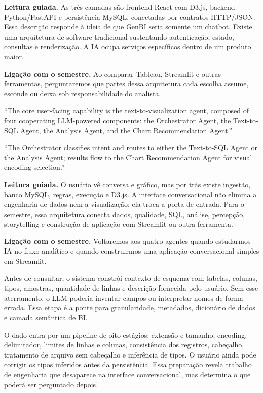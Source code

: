 \noindent\textbf{Leitura guiada.} As três camadas são frontend React com D3.js, backend Python/FastAPI e persistência MySQL, conectadas por contratos HTTP/JSON. Essa descrição responde à ideia de que GenBI seria somente um chatbot. Existe uma arquitetura de software tradicional sustentando autenticação, estado, consultas e renderização. A IA ocupa serviços específicos dentro de um produto maior.

\noindent\textbf{Ligação com o semestre.} Ao comparar Tableau, Streamlit e outras ferramentas, perguntaremos que partes dessa arquitetura cada escolha assume, esconde ou deixa sob responsabilidade do analista.

\begin{ArticleBox}
``The core user-facing capability is the text-to-visualization agent, composed of four cooperating LLM-powered components: the Orchestrator Agent, the Text-to-SQL Agent, the Analysis Agent, and the Chart Recommendation Agent.''

``The Orchestrator classifies intent and routes to either the Text-to-SQL Agent or the Analysis Agent; results flow to the Chart Recommendation Agent for visual encoding selection.''
\end{ArticleBox}

\noindent\textbf{Leitura guiada.} O usuário vê conversa e gráfico, mas por trás existe ingestão, banco MySQL, regras, execução e D3.js. A interface conversacional não elimina a engenharia de dados nem a visualização; ela troca a porta de entrada. Para o semestre, essa arquitetura conecta dados, qualidade, SQL, análise, percepção, storytelling e construção de aplicação com Streamlit ou outra ferramenta.

\noindent\textbf{Ligação com o semestre.} Voltaremos aos quatro agentes quando estudarmos IA no fluxo analítico e quando construirmos uma aplicação conversacional simples em Streamlit.

Antes de consultar, o sistema constrói contexto de esquema com tabelas, colunas, tipos, amostras, quantidade de linhas e descrição fornecida pelo usuário. Sem esse aterramento, o LLM poderia inventar campos ou interpretar nomes de forma errada. Essa etapa é a ponte para granularidade, metadados, dicionário de dados e camada semântica de BI.

O dado entra por um pipeline de oito estágios: extensão e tamanho, encoding, delimitador, limites de linhas e colunas, consistência dos registros, cabeçalho, tratamento de arquivo sem cabeçalho e inferência de tipos. O usuário ainda pode corrigir os tipos inferidos antes da persistência. Essa preparação revela trabalho de engenharia que desaparece na interface conversacional, mas determina o que poderá ser perguntado depois.

